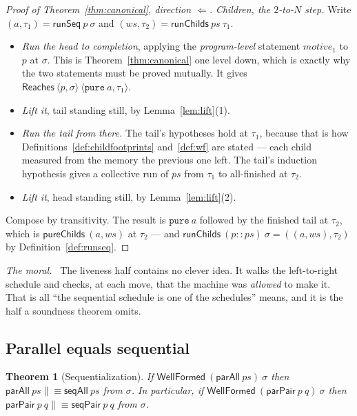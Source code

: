 \documentclass[11pt,a4paper]{article}
\theoremstyle{definition}
\theoremstyle{plain}
\newtheorem{theorem}[definition]{Theorem}
\theoremstyle{remark}
\newenvironment{moral}{\par\medskip\noindent\textit{The moral.}\ \ignorespaces}{\par\medskip}
\newcommand{\st}{\sigma}
\newcommand{\runSeq}{\mathsf{runSeq}}
\newcommand{\wf}{\mathsf{WellFormed}}
\newcommand{\Reaches}{\mathsf{Reaches}}
\begin{document}
\begin{proof}[Proof of Theorem~\ref{thm:canonical}, direction $\Longleftarrow$]
\emph{Children, the $2$-to-$N$ step.} Write $(a,\tau_1) = \runSeq\ p\ \st$ and
$(ws,\tau_2) = \mathsf{runChilds}\ ps\ \tau_1$.
\begin{itemize}[leftmargin=1.6em,itemsep=1pt]
\item \emph{Run the head to completion}, applying the \emph{program-level} statement
      $\mathit{motive}_1$ to $p$ at $\st$. This is Theorem~\ref{thm:canonical} one level down,
      which is exactly why the two statements must be proved mutually. It gives
      $\Reaches\ \langle p, \st\rangle\ \langle \texttt{pure}\ a, \tau_1\rangle$.
\item \emph{Lift it}, tail standing still, by Lemma~\ref{lem:lift}(1).
\item \emph{Run the tail from there.} The tail's hypotheses hold at $\tau_1$, because that is
      how Definitions~\ref{def:childfootprints} and~\ref{def:wf} are stated --- each child
      measured from the memory the previous one left. The tail's induction hypothesis gives a
      collective run of $ps$ from $\tau_1$ to all-finished at $\tau_2$.
\item \emph{Lift it}, head standing still, by Lemma~\ref{lem:lift}(2).
\end{itemize}
Compose by transitivity. The result is $\texttt{pure}\ a$ followed by the finished tail at
$\tau_2$, which is $\mathsf{pureChilds}\ (a, ws)$ at $\tau_2$ --- and
$\mathsf{runChilds}\ (p :: ps)\ \st = ((a,ws),\tau_2)$ by Definition~\ref{def:runseq}.
\end{proof}

\begin{moral}
The liveness half contains no clever idea. It walks the left-to-right schedule and checks, at
each move, that the machine was \emph{allowed} to make it. That is all ``the sequential
schedule is one of the schedules'' means, and it is the half a soundness theorem omits.
\end{moral}

\subsection{Parallel equals sequential}\label{sec:canonical:parseq}

\begin{theorem}[Sequentialization]\label{thm:parseq}
If $\wf\ (\mathsf{parAll}\ ps)\ \st$ then
$\mathsf{parAll}\ ps \mathrel{\|\!\equiv} \mathsf{seqAll}\ ps$ from $\st$. In particular, if
$\wf\ (\mathsf{parPair}\ p\ q)\ \st$ then
$\mathsf{parPair}\ p\ q \mathrel{\|\!\equiv} \mathsf{seqPair}\ p\ q$ from $\st$.
\end{theorem}
\end{document}

